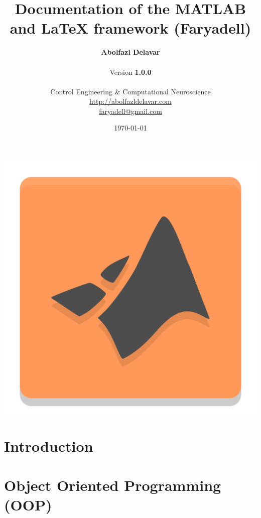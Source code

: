 \documentclass[11pt, letterpaper, onecolumn, english, notitlepage]{book}
\begin{document}
    \begin{titlepage}
        \begin{center}
            \title{Documentation of the MATLAB and \LaTeX{} framework (Faryadell)}
            \author{
                \textbf{Abolfazl Delavar}\\
                \\
                Version \textbf{1.0.0}\\
                \\
                Control Engineering \& Computational Neuroscience\\
                \href{http://abolfazldelavar.com}{http://abolfazldelavar.com}\\
                \href{mailto:faryadell@gmail.com}{faryadell@gmail.com}
            }
            \date{\today}
            \includegraphics[width=0.4\linewidth,trim=2 2 2 2,clip=true]{img/framework.png}
        \end{center}

    \end{titlepage}

    \maketitle

    \newpage

    \tableofcontents

    
    \vspace{2.5cm}
    \chapter{Introduction} {
        \newpage
        
    }

    \newpage
    \chapter{Object Oriented Programming (OOP)} {
        \newpage
        
    }
\end{document}
